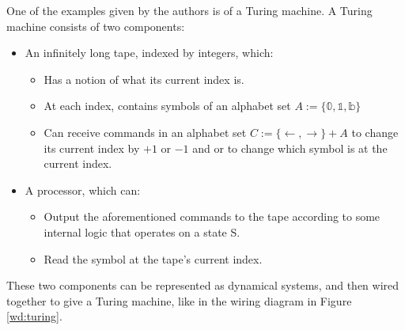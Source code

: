 One of the examples given by the authors is of a Turing machine. A Turing machine consists of two components:
\begin{itemize}
    \item An infinitely long tape, indexed by integers, which: \begin{itemize}
        \item Has a notion of what its current index is.
        \item At each index, contains symbols of an alphabet set $A := \{\mathbb{0}, \mathbb{1}, \mathbb{b}\}$ 
        \item Can receive commands in an alphabet set $C := \{\leftarrow, \rightarrow\} + A$ to change its current index by $+1$ or $-1$ and or to change which symbol is at the current index.
    \end{itemize}
    \item A processor, which can:
    \begin{itemize}
        \item Output the aforementioned commands to the tape according to some internal logic that operates on a state S.
        \item Read the symbol at the tape's current index.
    \end{itemize}
\end{itemize}

These two components can be represented as dynamical systems, and then wired together to give a Turing machine, like in the wiring diagram in Figure \ref{wd:turing}.

